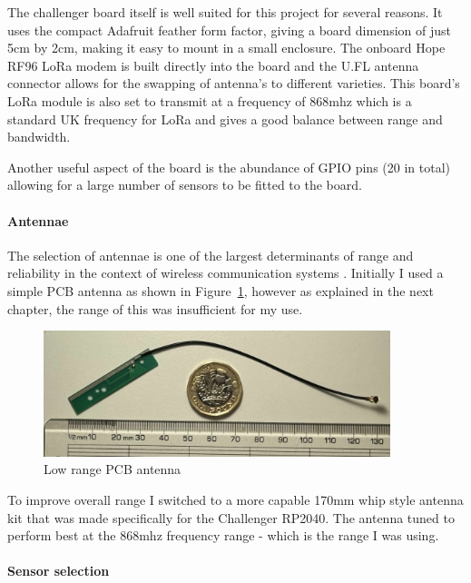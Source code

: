 The challenger board itself is well suited for this project for several reasons.
It uses the compact Adafruit feather form factor, giving a board dimension of
just 5cm by 2cm, making it easy to mount in a small enclosure. The onboard Hope
RF96 LoRa modem is built directly into the board and the U.FL antenna connector
allows for the swapping of antenna's to different varieties. This board's LoRa
module is also set to transmit at a frequency of 868mhz which is a standard UK
frequency for LoRa and gives a good balance between range and bandwidth. 

Another useful aspect of the board is the abundance of GPIO pins (20 in total)
allowing for a large number of sensors to be fitted to the board. 

\paragraph{Antennae}

The selection of antennae is one of the largest determinants of range and
reliability in the context of wireless communication systems \cite{khan2016}.
Initially I used a simple PCB antenna as shown in Figure~\ref{fig:pcb-antenna},
however as explained in the next chapter, the range of this was insufficient for
my use. 

\begin{figure}[H]
    \centering
    \includegraphics[width=0.9\textwidth]{contents/22-hw-design/22-fig/basic-antenna.jpg}
    \caption{Low range PCB antenna}
    \label{fig:pcb-antenna}
\end{figure}

To improve overall range I switched to a more capable 170mm whip style antenna
kit that was made specifically for the Challenger RP2040. The antenna tuned to
perform best at the 868mhz frequency range - which is the range I was using.

\paragraph{Sensor selection}

